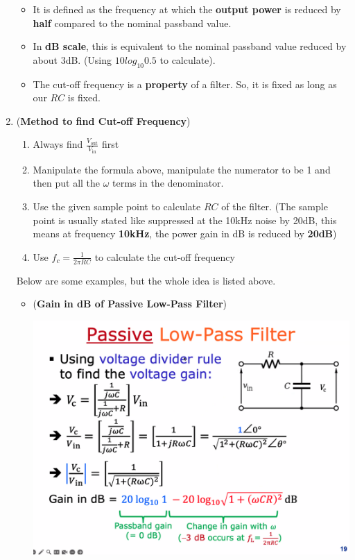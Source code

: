 \documentclass[10pt, landscape]{article}
\begin{document}
\begin{multicols}{4}
\begin{enumerate}
    \begin{itemize}
        \item It is defined as the frequency at which the \textbf{output power} is reduced by \textbf{half} compared to the nominal passband value.
        \item In \textbf{dB scale}, this is equivalent to the nominal passband value reduced by about 3dB. (Using $10log_{10}0.5$ to calculate).
        \item The cut-off frequency is a \textbf{property} of a filter. So, it is fixed as long as our $RC$ is fixed.
    \end{itemize}
    \item (\textbf{Method to find Cut-off Frequency})
    \begin{enumerate}
        \item Always find $\frac{V_{\text{out}}}{V_{\text{in}}}$ first
        \item Manipulate the formula above, manipulate the numerator to be 1 and then put all the $\omega$ terms in the denominator.
        \item Use the given sample point to calculate $RC$ of the filter. (The sample point is usually stated like suppressed at the 10kHz noise by 20dB, this means at frequency \textbf{10kHz}, the power gain in dB is reduced by \textbf{20dB}) 
        \item Use $f_c=\frac{1}{2\pi RC}$ to calculate the cut-off frequency
    \end{enumerate}
    Below are some examples, but the whole idea is listed above.
    \begin{itemize}
        \item (\textbf{Gain in dB of Passive Low-Pass Filter}) \\
        \centerline{\includegraphics[width=0.9\linewidth]{images/gain-of-passive-low-pass-filter.png}}

\end{itemize}
\end{enumerate}
\end{multicols}
\end{document}
